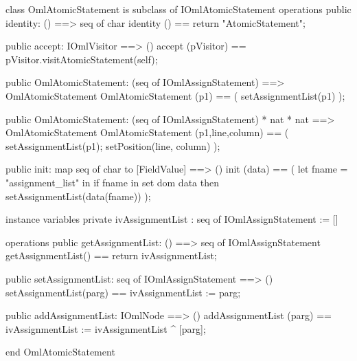 \begin{vdm_al}
class OmlAtomicStatement is subclass of IOmlAtomicStatement
operations
  public identity: () ==> seq of char
  identity () == return "AtomicStatement";

  public accept: IOmlVisitor ==> ()
  accept (pVisitor) == pVisitor.visitAtomicStatement(self);

  public OmlAtomicStatement:
    (seq of IOmlAssignStatement) ==> OmlAtomicStatement
  OmlAtomicStatement (p1) == 
    ( setAssignmentList(p1) );

  public OmlAtomicStatement:
    (seq of IOmlAssignStatement) *
    nat *
    nat ==> OmlAtomicStatement
  OmlAtomicStatement (p1,line,column) == 
    ( setAssignmentList(p1);
      setPosition(line, column) );

  public init: map seq of char to [FieldValue] ==> ()
  init (data) ==
    ( let fname = "assignment_list" in
        if fname in set dom data
        then setAssignmentList(data(fname)) );

instance variables
  private ivAssignmentList : seq of IOmlAssignStatement := []

operations
  public getAssignmentList: () ==> seq of IOmlAssignStatement
  getAssignmentList() == return ivAssignmentList;

  public setAssignmentList: seq of IOmlAssignStatement ==> ()
  setAssignmentList(parg) == ivAssignmentList := parg;

  public addAssignmentList: IOmlNode ==> ()
  addAssignmentList (parg) == ivAssignmentList := ivAssignmentList ^ [parg];

end OmlAtomicStatement
\end{vdm_al}

